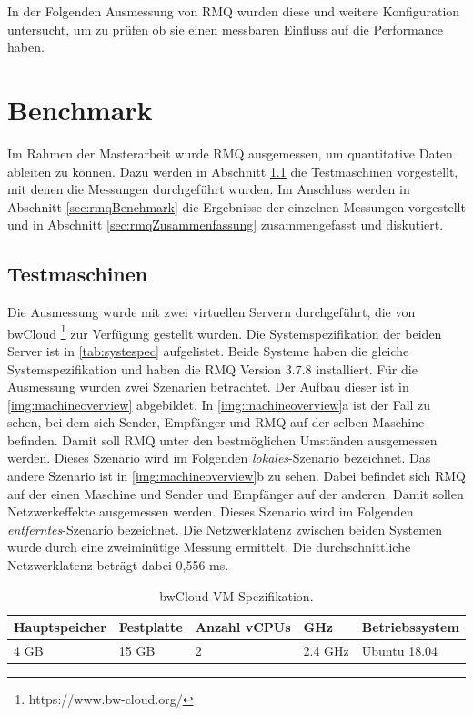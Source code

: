 In der Folgenden Ausmessung von RMQ wurden diese und weitere Konfiguration untersucht, um zu prüfen ob sie einen messbaren Einfluss auf die Performance haben.

\section{Benchmark}
Im Rahmen der Masterarbeit wurde RMQ ausgemessen, um quantitative Daten ableiten zu können. Dazu werden in Abschnitt \ref{sec:testmachine} die Testmaschinen vorgestellt, mit denen die Messungen durchgeführt wurden. Im Anschluss werden in Abschnitt \ref{sec:rmqBenchmark} die Ergebnisse der einzelnen Messungen vorgestellt und in Abschnitt \ref{sec:rmqZusammenfassung} zusammengefasst und diskutiert.

\subsection{Testmaschinen}
\label{sec:testmachine}
Die Ausmessung wurde mit zwei virtuellen Servern durchgeführt, die von bwCloud \footnote{https://www.bw-cloud.org/} zur Verfügung gestellt wurden. Die Systemspezifikation der beiden Server ist in \autoref{tab:systespec} aufgelistet. Beide Systeme haben die gleiche Systemspezifikation und haben die RMQ Version 3.7.8 installiert. Für die Ausmessung wurden zwei Szenarien betrachtet. Der Aufbau dieser ist in \autoref{img:machineoverview} abgebildet. In \autoref{img:machineoverview}a ist der Fall zu sehen, bei dem sich Sender, Empfänger und RMQ auf der selben Maschine befinden. Damit soll RMQ unter den bestmöglichen Umständen ausgemessen werden. Dieses Szenario wird im Folgenden \textit{lokales}-Szenario bezeichnet. Das andere Szenario ist in \autoref{img:machineoverview}b zu sehen. Dabei befindet sich RMQ auf der einen Maschine und Sender und Empfänger auf der anderen. Damit sollen Netzwerkeffekte ausgemessen werden. Dieses Szenario wird im Folgenden \textit{entferntes}-Szenario bezeichnet. Die Netzwerklatenz zwischen beiden Systemen wurde durch eine zweiminütige Messung ermittelt. Die durchschnittliche Netzwerklatenz beträgt dabei 0,556 ms. 

\begin{table}
  \centering
  \begin{tabular}{|l|l|l|l|l|}
    Hauptspeicher & Festplatte & Anzahl vCPUs & GHz & Betriebssystem \\
    \hline
     4 GB & 15 GB & 2 & 2.4 GHz & Ubuntu 18.04
  \end{tabular}
	\caption{\label{tab:systespec} bwCloud-VM-Spezifikation.}
\end{table}

